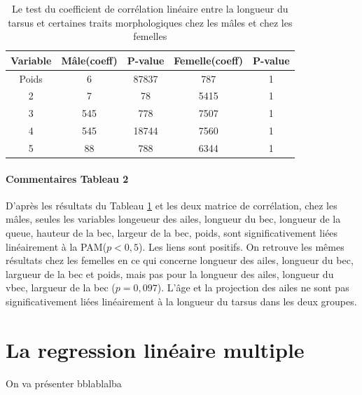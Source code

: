 \documentclass[12pt, twocolumn]{article}
\begin{document}
\begin{table}[h!]
    \centering
    \begin{adjustbox}{width=0.4\textwidth}
    \small
    \begin{tabular}{||c c c c c||} 
     \hline
     Variable & Mâle(coeff) & P-value & Femelle(coeff) & P-value \\ [0.5ex] 
     \hline\hline
     Poids & 6 & 87837 & 787 & 1\\ 
     2 & 7 & 78 & 5415 & 1\\
     3 & 545 & 778 & 7507 & 1\\
     4 & 545 & 18744 & 7560 & 1\\
     5 & 88 & 788 & 6344 & 1\\ [0.5ex] 
     \hline
    \end{tabular}
\end{adjustbox}
    \caption{Le test du coefficient de corrélation linéaire entre la longueur du tarsus et certaines traits morphologiques chez les mâles et chez les femelles}
    \label{table:2}
\end{table}

\paragraph{Commentaires Tableau 2}

D'après les résultats du Tableau \ref{table:2} et les deux matrice de corrélation, chez les mâles, seules les variables longeueur des ailes, longueur du bec, longueur de la queue, hauteur de la bec, largeur
de la bec, poids, sont significativement liées linéairement à la PAM($ p < 0,5 $). Les liens sont positifs. On retrouve les mêmes résultats chez les femelles en ce qui concerne longueur des ailes, longueur du bec, largueur de la bec et poids,
mais pas pour la longueur des ailes, longueur du vbec, largueur de la bec ($p = 0,097$). L'âge et la projection des ailes ne sont pas significativement liées linéairement à la longueur du tarsus dans les deux groupes.

\section{La regression linéaire multiple}
On va présenter bblablalba
\end{document}

